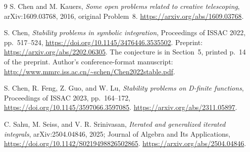 \begin{thebibliography}{9}
S. Chen and M. Kauers,
\emph{Some open problems related to creative telescoping},
arXiv:1609.03768, 2016, original Problem~8.
\url{https://arxiv.org/abs/1609.03768}.

S. Chen, \emph{Stability problems in symbolic integration},
Proceedings of ISSAC 2022, pp.~517--524,
\url{https://doi.org/10.1145/3476446.3535502}.
Preprint: \url{https://arxiv.org/abs/2202.06305}.
The conjecture is in Section~5, printed p.~14 of the preprint.
Author's conference-format manuscript:
\url{http://www.mmrc.iss.ac.cn/~schen/Chen2022stable.pdf}.

S. Chen, R. Feng, Z. Guo, and W. Lu,
\emph{Stability problems on D-finite functions},
Proceedings of ISSAC 2023, pp.~164--172,
\url{https://doi.org/10.1145/3597066.3597085}.
\url{https://arxiv.org/abs/2311.05897}.

C. Sahu, M. Seiss, and V. R. Srinivasan,
\emph{Iterated and generalized iterated integrals},
arXiv:2504.04846, 2025;
Journal of Algebra and Its Applications,
\url{https://doi.org/10.1142/S0219498826502865}.
\url{https://arxiv.org/abs/2504.04846}.
\end{thebibliography}


